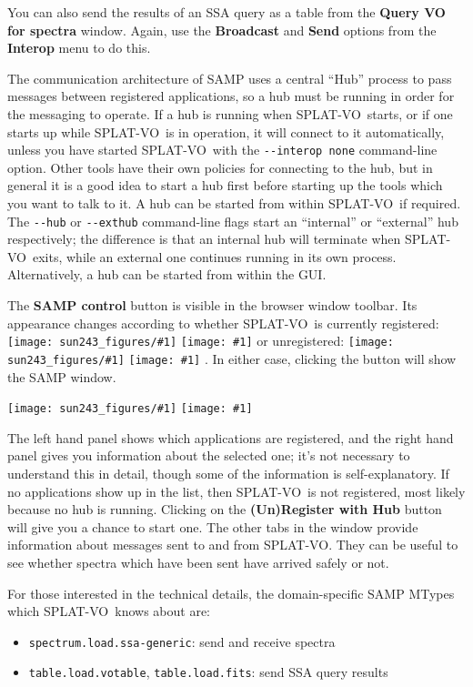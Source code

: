 \documentclass[twoside,11pt,nolof]{starlink}
\providecommand{\SPLAT}{\textsf{SPLAT-VO}}
\providecommand{\mainfigure}[1]
{\begin{center}
    \ifpdf
    \texttt{[image: sun243\_figures/\#1]}
    \else
    \texttt{[image: \#1]}
    \fi
 \end{center}
}
\providecommand{\inline}[1]
        {\ifpdf
          \texttt{[image: sun243\_figures/\#1]}
          \else
          \texttt{[image: \#1]}
          \fi
        }
\renewcommand{\menuitem}[1]{\textbf{#1}}
\newcommand{\labelitem}[1]{\textbf{#1}}
\providecommand{\hitext}[1]{\texttt{#1}}
\begin{document}
You can also send the results of an SSA query as a table from the
\labelitem{Query VO for spectra} window.  Again, use the
\menuitem{Broadcast} and \menuitem{Send} options from the
\menuitem{Interop} menu to do this.

The communication architecture of SAMP uses a central ``Hub'' process to pass
messages between registered applications, so a hub must be running in order
for the messaging to operate.  If a hub is running when \SPLAT\ starts, or if
one starts up while \SPLAT\ is in operation, it will connect to it
automatically, unless you have started \SPLAT\ with the \verb+--interop none+
command-line option.  Other tools have their own policies for connecting to
the hub, but in general it is a good idea to start a hub first before starting
up the tools which you want to talk to it.  A hub can be started from within
\SPLAT\ if required.  The \verb+--hub+ or \verb+--exthub+ command-line flags start an
``internal'' or ``external'' hub respectively; the difference is that an
internal hub will terminate when \SPLAT\ exits, while an external one
continues running in its own process.  Alternatively, a hub can be started
from within the GUI.

The \labelitem{SAMP control} button is visible in the
browser window toolbar.  Its appearance changes according to whether
\SPLAT\ is currently registered: \inline{sampgo} or
unregistered: \inline{samp}.
In either case, clicking the button will show the SAMP window.

\mainfigure{sampwindow}

The left hand panel shows which applications are registered,
and the right hand panel gives you information about the selected one;
it's not necessary to understand this in detail, though
some of the information is self-explanatory.
If no applications show up in the list, then \SPLAT\ is not registered,
most likely because no hub is running.  Clicking on the
\labelitem{(Un)Register with Hub} button will give you a chance to start one.
The other tabs in the window provide information about messages
sent to and from \SPLAT.  They can be useful to
see whether spectra which have been sent have arrived safely or not.

For those interested in the technical details, the domain-specific
SAMP MTypes which \SPLAT\ knows about are:
\begin{itemize}
\item \hitext{spectrum.load.ssa-generic}:
      send and receive spectra
\item \hitext{table.load.votable}, \hitext{table.load.fits}:
      send SSA query results
\end{itemize}
\end{document}
